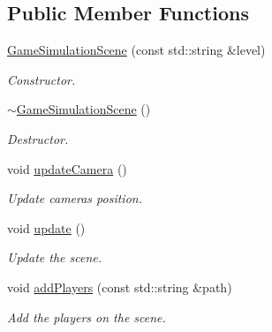 \subsection*{Public Member Functions}
\begin{DoxyCompactItemize}
\item 
\mbox{\label{classGameSimulationScene_add6f8629146c02b893b0d69825405d5c}} 
\hyperlink{classGameSimulationScene_add6f8629146c02b893b0d69825405d5c}{Game\+Simulation\+Scene} (const std\+::string \&level)
\begin{DoxyCompactList}\small\item\em Constructor. \end{DoxyCompactList}\item 
\mbox{\label{classGameSimulationScene_af45f3e7f70376e59a6f320f21ce2897b}} 
\hyperlink{classGameSimulationScene_af45f3e7f70376e59a6f320f21ce2897b}{$\sim$\+Game\+Simulation\+Scene} ()
\begin{DoxyCompactList}\small\item\em Destructor. \end{DoxyCompactList}\item 
\mbox{\label{classGameSimulationScene_aae1a8d0e8d3f8b1cc51c9291b96c52ec}} 
void \hyperlink{classGameSimulationScene_aae1a8d0e8d3f8b1cc51c9291b96c52ec}{update\+Camera} ()
\begin{DoxyCompactList}\small\item\em Update camera\textquotesingle{}s position. \end{DoxyCompactList}\item 
\mbox{\label{classGameSimulationScene_ad8aa00e84395730039cfb6ef926917ea}} 
void \hyperlink{classGameSimulationScene_ad8aa00e84395730039cfb6ef926917ea}{update} ()
\begin{DoxyCompactList}\small\item\em Update the scene. \end{DoxyCompactList}\item 
\mbox{\label{classGameSimulationScene_a0b59195981987f7a6e8701a3c3941890}} 
void \hyperlink{classGameSimulationScene_a0b59195981987f7a6e8701a3c3941890}{add\+Players} (const std\+::string \&path)
\begin{DoxyCompactList}\small\item\em Add the players on the scene. \end{DoxyCompactList}\item 

\end{DoxyCompactItemize}
